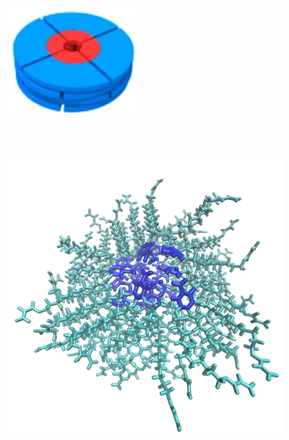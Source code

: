 \documentclass{article}
\begin{document}
  \begin{figure}
  \centering
	\begin{subfigure}{0.45\linewidth}
		\centering
		\includegraphics[width=\textwidth]{nanopore_undetailed.jpg}
		\caption{}~\label{fig:undetailed_pore}
	\end{subfigure}
	\begin{subfigure}{0.45\linewidth}
		\centering
		\includegraphics[width=\textwidth]{detailed_pore.png}

\end{subfigure}
\end{figure}
\end{document}
